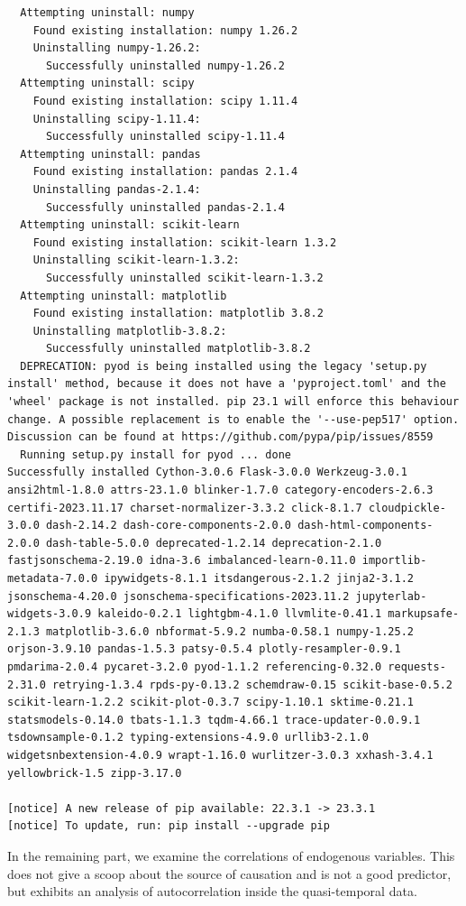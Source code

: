 \documentclass[
  letterpaper,
  DIV=11,
  numbers=noendperiod]{scrartcl}
\begin{document}
\begin{verbatim}
  Attempting uninstall: numpy
    Found existing installation: numpy 1.26.2
    Uninstalling numpy-1.26.2:
      Successfully uninstalled numpy-1.26.2
  Attempting uninstall: scipy
    Found existing installation: scipy 1.11.4
    Uninstalling scipy-1.11.4:
      Successfully uninstalled scipy-1.11.4
  Attempting uninstall: pandas
    Found existing installation: pandas 2.1.4
    Uninstalling pandas-2.1.4:
      Successfully uninstalled pandas-2.1.4
  Attempting uninstall: scikit-learn
    Found existing installation: scikit-learn 1.3.2
    Uninstalling scikit-learn-1.3.2:
      Successfully uninstalled scikit-learn-1.3.2
  Attempting uninstall: matplotlib
    Found existing installation: matplotlib 3.8.2
    Uninstalling matplotlib-3.8.2:
      Successfully uninstalled matplotlib-3.8.2
  DEPRECATION: pyod is being installed using the legacy 'setup.py install' method, because it does not have a 'pyproject.toml' and the 'wheel' package is not installed. pip 23.1 will enforce this behaviour change. A possible replacement is to enable the '--use-pep517' option. Discussion can be found at https://github.com/pypa/pip/issues/8559
  Running setup.py install for pyod ... done
Successfully installed Cython-3.0.6 Flask-3.0.0 Werkzeug-3.0.1 ansi2html-1.8.0 attrs-23.1.0 blinker-1.7.0 category-encoders-2.6.3 certifi-2023.11.17 charset-normalizer-3.3.2 click-8.1.7 cloudpickle-3.0.0 dash-2.14.2 dash-core-components-2.0.0 dash-html-components-2.0.0 dash-table-5.0.0 deprecated-1.2.14 deprecation-2.1.0 fastjsonschema-2.19.0 idna-3.6 imbalanced-learn-0.11.0 importlib-metadata-7.0.0 ipywidgets-8.1.1 itsdangerous-2.1.2 jinja2-3.1.2 jsonschema-4.20.0 jsonschema-specifications-2023.11.2 jupyterlab-widgets-3.0.9 kaleido-0.2.1 lightgbm-4.1.0 llvmlite-0.41.1 markupsafe-2.1.3 matplotlib-3.6.0 nbformat-5.9.2 numba-0.58.1 numpy-1.25.2 orjson-3.9.10 pandas-1.5.3 patsy-0.5.4 plotly-resampler-0.9.1 pmdarima-2.0.4 pycaret-3.2.0 pyod-1.1.2 referencing-0.32.0 requests-2.31.0 retrying-1.3.4 rpds-py-0.13.2 schemdraw-0.15 scikit-base-0.5.2 scikit-learn-1.2.2 scikit-plot-0.3.7 scipy-1.10.1 sktime-0.21.1 statsmodels-0.14.0 tbats-1.1.3 tqdm-4.66.1 trace-updater-0.0.9.1 tsdownsample-0.1.2 typing-extensions-4.9.0 urllib3-2.1.0 widgetsnbextension-4.0.9 wrapt-1.16.0 wurlitzer-3.0.3 xxhash-3.4.1 yellowbrick-1.5 zipp-3.17.0

[notice] A new release of pip available: 22.3.1 -> 23.3.1
[notice] To update, run: pip install --upgrade pip
\end{verbatim}

In the remaining part, we examine the correlations of endogenous
variables. This does not give a scoop about the source of causation and
is not a good predictor, but exhibits an analysis of autocorrelation
inside the quasi-temporal data.
\end{document}
